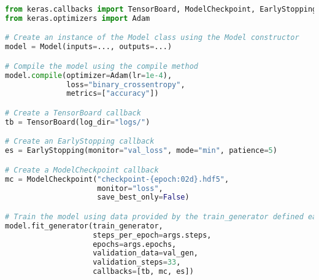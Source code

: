 \begin{lstlisting}[float={ht},caption={NEED TO FINISH THIS CAPTION. Use Keras Adam optimiser implementation, the Keras implementation of the binary cross-entropy loss, and the Keras accuracy metric.},label={lst:compile},language=Python,upquote=true]
from keras.callbacks import TensorBoard, ModelCheckpoint, EarlyStopping
from keras.optimizers import Adam

# Create an instance of the Model class using the Model constructor
model = Model(inputs=..., outputs=...)

# Compile the model using the compile method
model.compile(optimizer=Adam(lr=1e-4), 
              loss="binary_crossentropy",
              metrics=["accuracy"])

# Create a TensorBoard callback
tb = TensorBoard(log_dir="logs/")

# Create an EarlyStopping callback
es = EarlyStopping(monitor="val_loss", mode="min", patience=5)

# Create a ModelCheckpoint callback
mc = ModelCheckpoint("checkpoint-{epoch:02d}.hdf5",
                     monitor="loss",
                     save_best_only=False)

# Train the model using data provided by the train_generator defined earlier
model.fit_generator(train_generator, 
                    steps_per_epoch=args.steps, 
                    epochs=args.epochs,
                    validation_data=val_gen,
                    validation_steps=33,
                    callbacks=[tb, mc, es])
\end{lstlisting}
